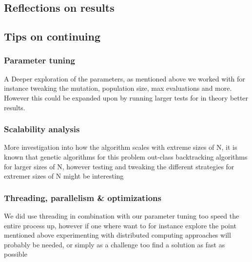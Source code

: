 \documentclass{scrartcl}
\begin{document}
\subsection{Reflections on results}
\subsection{Tips on continuing}
\subsubsection{Parameter tuning}
A Deeper exploration of the parameters, as mentioned above we worked with for instance tweaking the mutation, population size, max evaluations and more. However this could be expanded upon by running larger tests for in theory better results.
\subsubsection{Scalability analysis}
More investigation into how the algorithm scales with extreme sizes of N, it is known that genetic algorithms for this problem out-class backtracking algorithms for larger sizes of N, however testing and tweaking the different strategies for extremer sizes of N might be interesting
\subsubsection{Threading, parallelism \& optimizations}
We did use threading in combination with our parameter tuning too speed the entire process up, however if one where want to for instance explore the point mentioned above experimenting with distributed computing approaches will probably be needed, or simply as a challenge too find a solution as fast as possible




\end{document}
